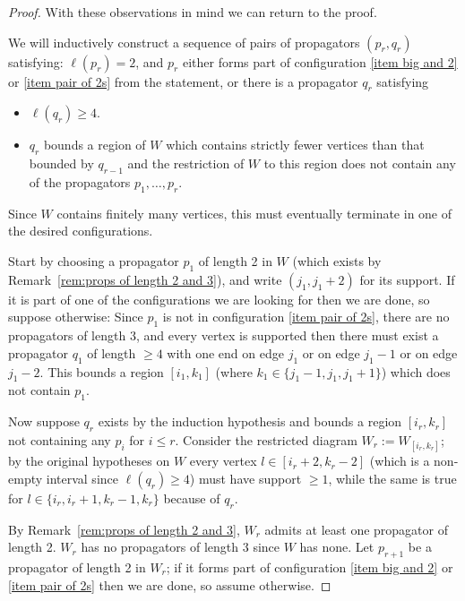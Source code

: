 \documentclass[11pt]{article}
\theoremstyle{remark}
\theoremstyle{definition}
\begin{document}
\begin{proof}
With these observations in mind we can return to the proof.
  
  We will inductively construct a sequence of pairs of propagators $(p_r,q_r)$ satisfying: $\ell(p_r) = 2$, and $p_r$ either forms part of configuration \ref{item big and 2} or \ref{item pair of 2s} from the statement,
  or there is a propagator $q_r$ satisfying
\begin{itemize}
\item $\ell(q_r) \geq 4$.
\item $q_r$ bounds a region of $W$ which contains strictly fewer vertices than that bounded by $q_{r-1}$ and the restriction of $W$ to this region does not contain any of the propagators $p_1, \dots, p_r$.
\end{itemize}
Since $W$ contains finitely many vertices, this must eventually terminate in one of the desired configurations. %

Start by choosing a propagator $p_1$ of length 2 in $W$ (which exists by Remark~\ref{rem:props of length 2 and 3}), and write $(j_1,j_1+2)$ for its support.  If it is part of one of the configurations we are looking for then we are done, 
so suppose otherwise: 
Since $p_1$ is not in configuration \ref{item pair of 2s}, there are no propagators of length $3$, and every vertex is supported then there must exist a propagator $q_1$ of length $\geq 4$ with one end on edge $j_1$ or on edge $j_1-1$ or on edge $j_1-2$.  This bounds a region $[i_1,k_1]$ (where $k_1 \in \{j_1-1, j_1, j_1+1\}$) which does not contain $p_1$.

Now suppose $q_{r}$ exists by the induction hypothesis and bounds a region $[i_r,k_r]$ not containing any $p_i$ for $i\leq r$.  Consider the restricted diagram $W_r:=W_{[i_r,k_r]}$; by the original hypotheses on $W$ every vertex $l \in [i_r+2,k_r-2]$ (which is a non-empty interval since $\ell(q_r) \geq 4$) must have support $\geq 1$, while the same is true for $l \in \{i_r,i_r+1,k_r-1,k_r\}$ because of $q_r$.  

By Remark~\ref{rem:props of length 2 and 3}, $W_r$ admits at least one propagator of length 2.  $W_r$ has no propagators of length $3$ since $W$ has none.  Let $p_{r+1}$ be a propagator of length 2 in $W_r$; if it forms part of configuration \ref{item big and 2} or \ref{item pair of 2s}
then we are done, so assume otherwise.


\end{proof}
\end{document}
